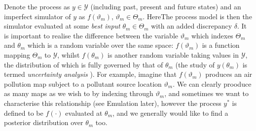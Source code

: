 \documentclass[10pt,a4paper]{article}
\begin{document}
Denote the process as  $y \in \mathcal{Y}$ (including past, present and future states) and an imperfect simulator of $y$ as $f(\vartheta_m)$, $\vartheta_m \in \Theta_m$. HereThe process model is then the simulator evaluated at some \emph{best input} $\theta_m \in \Theta_m$ with an added discrepancy $\delta$. It is important to realise the difference between the variable $\vartheta_m$ which indexes $\Theta_m$ and $\theta_m$ which is a random variable over the same space: $f(\vartheta_m)$ is a function mapping $\Theta_m$ to $\mathcal{Y}$, whilst $f(\theta_m)$ is another random variable taking values in $\mathcal{Y}$, the distribution of which is fully governed by that of $\theta_m$ (the study of $y(\theta_m)$ is termed \emph{uncertainty analysis} \cite{OHagan_1998}). For example, imagine that $f(\vartheta_m)$ produces an air pollution map subject to a pollutant source location $\vartheta_m$. We can clearly prooduce as many maps as we wish to by indexing through $\vartheta_m$, and sometimes we want to characterise this relationship (see Emulation later), however the process $y^*$ is defined to be $f(\cdot)$ evaluated at $\theta_m$, and we generally would like to find a posterior distribution over $\theta_m$ too. 
\end{document}
